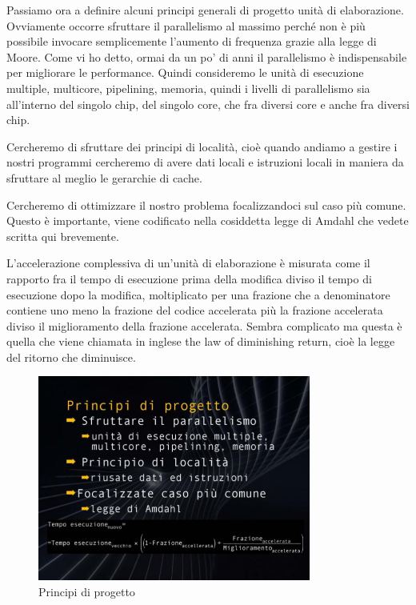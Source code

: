 Passiamo ora a definire alcuni principi generali di progetto unità di elaborazione.
Ovviamente occorre sfruttare il parallelismo al massimo perché non è più possibile invocare semplicemente l'aumento di frequenza grazie alla legge di Moore.
Come vi ho detto, ormai da un po' di anni il parallelismo è indispensabile per migliorare le performance.
Quindi consideremo le unità di esecuzione multiple, multicore, pipelining, memoria, quindi i livelli di parallelismo sia all'interno del singolo chip, del singolo core, che fra diversi core e anche fra diversi chip.

Cercheremo di sfruttare dei principi di località, cioè quando andiamo a gestire i nostri programmi cercheremo di avere dati locali e istruzioni locali in maniera da sfruttare al meglio le gerarchie di cache.

Cercheremo di ottimizzare il nostro problema focalizzandoci sul caso più comune. Questo è importante, viene codificato nella cosiddetta legge di Amdahl che vedete scritta qui brevemente.

L'accelerazione complessiva di un'unità di elaborazione è misurata come il rapporto fra il tempo di esecuzione prima della modifica diviso il tempo di esecuzione dopo la modifica, moltiplicato per una frazione che a denominatore contiene uno meno la frazione del codice accelerata più la frazione accelerata diviso il miglioramento della frazione accelerata.
Sembra complicato ma questa è quella che viene chiamata in inglese the law of diminishing return, cioè la legge del ritorno che diminuisce.

\FloatBarrier
\begin{figure}[H]
  \centering
  \includegraphics[width=0.80\textwidth,
                    trim=10 40 10 40, %
                    clip]
                    {images/Lez03_p04_fig_04.png}
  \caption{Principi di progetto}
  \label{fig:Lez03_p04_fig_04}
\end{figure}
\FloatBarrier
\noindent

